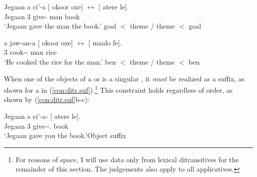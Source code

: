 \documentclass[output=paper,
modfonts
]{langscibook}
\begin{document}
\begin{exe}
\ex \label{con:ditr.order} 
\begin{xlista}

\ex \gll Jegaan a ci'-a [ okoor oxe]\goal{} $\leftrightarrow$ [ atere le]\theme{}.\\
Jegaan 3 give-\Dv{} {} man \Det{} {} {} book \Det{} {} \\
\glt `Jegaan gave the man the book.'\hfill  \cmark{} {{\sc goal $<$ theme}} /  \cmark{} {{\sc theme $<$ goal}}

\end{xlista}
\end{exe}

\begin{exe}
\ex \label{con:appl.order} 
\begin{xlista}

\ex \gll a jaw-an-a [ okoor oxe]\baierben{} $\leftrightarrow$ [ maalo fe]\theme{}.\\
3 cook-\Ben{}-\Dv{} {} man \Det{} {} {} rice \Det{} {} \\
\glt `He cooked the rice for the man.'\hfill  \cmark{} {{\sc ben $<$ theme}} / \cmark{} {{\sc theme $<$ ben}}

\end{xlista}
\end{exe}

\noindent When one of the objects of a  or   is a singular , it \textit{must} be realized as a suffix, as shown for a   in (\ref{con:ditr.suf}).\footnote{For reasons of space, I will use data only from lexical ditransitives for the remainder of this section. The judgements also apply to all applicatives.} This constraint holds regardless of order, as shown by (\ref{con:ditr.suf}b-c):

\begin{exe}
\ex \label{con:ditr.suf} 
\begin{xlista}

\ex \gll Jegaan a ci'-a- [ atere le]\theme{}.\\
Jegaan 3 give-\Dv{}-\Ssg{}.\Obj{} {} book \Det{} {} \\
\glt `Jegaan gave you the book.'\hfill {Object suffix}



\end{xlista}
\end{exe}
\end{document}
